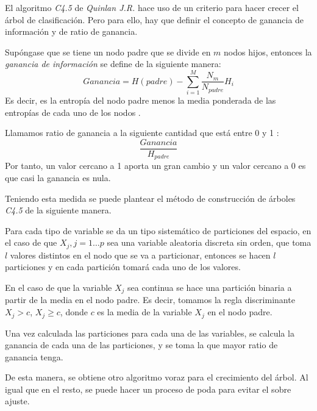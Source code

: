 \noindent El algoritmo \emph{C4.5} de \emph{Quinlan J.R.} \cite{Quinlan 2014} hace uso de un criterio para hacer crecer el árbol de clasificación. Pero para ello, hay que definir el concepto de ganancia de información y de ratio de ganancia.
\begin{defi}
Supóngase que se tiene un nodo padre que se divide en $m$ nodos hijos, entonces la \emph{ganancia de información } se define de la siguiente manera: 
\begin{equation}
Ganancia=H(padre)-\sum_{i=1}^M \dfrac{N_m}{N_{padre}}H_i
\end{equation}
\noindent Es decir, es la entropía del nodo padre menos la media ponderada de las entropías de cada uno de los nodos \cite{Brown 2004}. 
\end{defi}

\begin{defi}
Llamamos ratio de ganancia a la siguiente cantidad que está entre 0 y 1 \cite{Brown 2004}:
\begin{equation}
\dfrac{Ganancia}{H_{padre}}
\end{equation}
Por tanto, un valor cercano a 1  aporta un gran cambio y un valor cercano a 0 es que casi la ganancia es nula.   
\end{defi}

\noindent Teniendo esta medida se puede plantear el método de construcción de árboles \emph{C4.5} \cite{Loh 2014} de la siguiente manera.

\noindent Para cada tipo de variable se da un tipo sistemático de particiones del espacio, en el caso de que $X_j, j=1\ldots p$ sea una variable aleatoria discreta sin orden, que toma $l$ valores distintos en el nodo que se va a particionar, entonces se hacen $l$ particiones y en cada partición tomará cada uno de los valores. 

\noindent En el caso de que la variable $X_j$ sea continua se hace una partición binaria a partir de la media en el nodo padre. Es decir, tomamos la regla discriminante $X_j>c$, $X_j\geq c$, donde $c$ es la media de la variable $X_j$ en el nodo padre. 

\noindent Una vez calculada las particiones para cada una de las variables, se calcula la ganancia de cada una de las particiones, y se toma la que mayor ratio de ganancia tenga. 

\noindent De esta manera, se obtiene otro algoritmo voraz para el crecimiento del árbol. Al igual que en el resto, se puede hacer un proceso de poda para evitar el sobre ajuste. 


